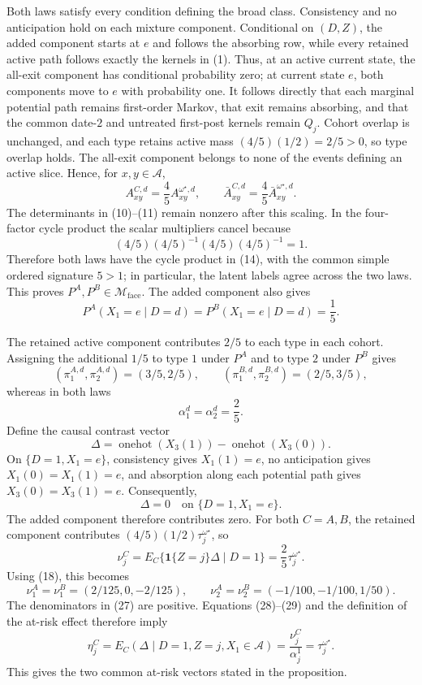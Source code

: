 Both laws satisfy every condition defining the broad class.  Consistency and no anticipation hold on each mixture component.  Conditional on \((D,Z)\), the added component starts at \(e\) and follows the absorbing row, while every retained active path follows exactly the kernels in (1).  Thus, at an active current state, the all-exit component has conditional probability zero; at current state \(e\), both components move to \(e\) with probability one.  It follows directly that each marginal potential path remains first-order Markov, that exit remains absorbing, and that the common date-\(2\) and untreated first-post kernels remain \(Q_j\).  Cohort overlap is unchanged, and each type retains active mass \((4/5)(1/2)=2/5>0\), so type overlap holds.  The all-exit component belongs to none of the events defining an active slice.  Hence, for \(x,y\in\mathcal A\),
\[
A_{xy}^{C,d}=\frac45A_{xy}^{\omega^\star,d},
\qquad
\bar A_{xy}^{C,d}=\frac45\bar A_{xy}^{\omega^\star,d}.      \tag{23}
\]
The determinants in (10)--(11) remain nonzero after this scaling.  In the four-factor cycle product the scalar multipliers cancel because
\[
(4/5)(4/5)^{-1}(4/5)(4/5)^{-1}=1.                           \tag{24}
\]
Therefore both laws have the cycle product in (14), with the common simple ordered signature \(5>1\); in particular, the latent labels agree across the two laws.  This proves \(P^A,P^B\in\mathcal M_{\mathrm{face}}\).  The added component also gives
\[
P^A(X_1=e\mid D=d)=P^B(X_1=e\mid D=d)=\frac15.              \tag{25}
\]

The retained active component contributes \(2/5\) to each type in each cohort.  Assigning the additional \(1/5\) to type \(1\) under \(P^A\) and to type \(2\) under \(P^B\) gives
\[
(\pi_1^{A,d},\pi_2^{A,d})=(3/5,2/5),
\qquad
(\pi_1^{B,d},\pi_2^{B,d})=(2/5,3/5),                       \tag{26}
\]
whereas in both laws
\[
\alpha_1^d=\alpha_2^d=\frac25.                              \tag{27}
\]
Define the causal contrast vector
\[
\Delta=\operatorname{onehot}(X_3(1))-
\operatorname{onehot}(X_3(0)).
\]
On \(\{D=1,X_1=e\}\), consistency gives \(X_1(1)=e\), no anticipation gives \(X_1(0)=X_1(1)=e\), and absorption along each potential path gives \(X_3(0)=X_3(1)=e\).  Consequently,
\[
\Delta=0\quad\text{on }\{D=1,X_1=e\}.                     \tag{28}
\]
The added component therefore contributes zero.  For both \(C=A,B\), the retained component contributes \((4/5)(1/2)\tau_j^{\omega^\star}\), so
\[
\nu_j^C=E_C\{\mathbf 1\{Z=j\}\Delta\mid D=1\}
=\frac25\tau_j^{\omega^\star}.                            \tag{29}
\]
Using (18), this becomes
\[
\nu_1^A=\nu_1^B=(2/125,0,-2/125),
\qquad
\nu_2^A=\nu_2^B=(-1/100,-1/100,1/50).                       \tag{30}
\]
The denominators in (27) are positive.  Equations (28)--(29) and the definition of the at-risk effect therefore imply
\[
\eta_j^C
=E_C(\Delta\mid D=1,Z=j,X_1\in\mathcal A)
=\frac{\nu_j^C}{\alpha_j^1}
=\tau_j^{\omega^\star}.                                    \tag{31}
\]
This gives the two common at-risk vectors stated in the proposition.

